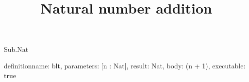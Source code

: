 \begin{lexlean}{Sub.Nat}
\title{Natural number addition}
\begin{semanticmodule}
definition{name: blt, parameters: [n : Nat], result: Nat, body: (n + 1), executable: true}
\end{semanticmodule}
\end{lexlean}
